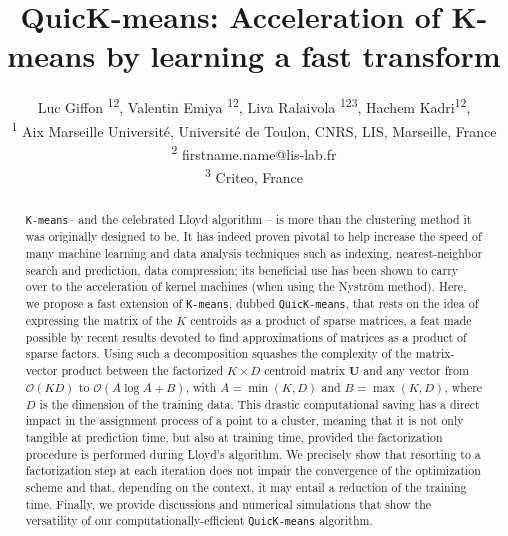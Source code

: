 \documentclass[letterpaper]{article} %
\title{QuicK-means: Acceleration of K-means by learning a fast transform}
\author{%
  Luc Giffon  \textsuperscript{\rm 1}\textsuperscript{\rm 2},
Valentin Emiya \textsuperscript{\rm 1}\textsuperscript{\rm 2},
Liva Ralaivola \textsuperscript{\rm 1}\textsuperscript{\rm 2}\textsuperscript{\rm 3},   Hachem Kadri\textsuperscript{\rm 1}\textsuperscript{\rm 2}, \\
\textsuperscript{\rm 1} Aix Marseille Université, Université de Toulon, CNRS, LIS, Marseille, France \\
\textsuperscript{\rm 2} firstname.name@lis-lab.fr \\
\textsuperscript{\rm 3} Criteo, France
}
\def\datadim{D}
\def\nclusters{K}
\def\kmeans{\texttt{K-means}\xspace}
\begin{document}
\maketitle

\begin{abstract}
\kmeans -- and the celebrated Lloyd algorithm -- is more than the clustering method it was originally designed to be. 
	It has indeed proven pivotal to help increase the speed of many machine learning and data analysis techniques such as indexing, nearest-neighbor search and prediction, data compression; its beneficial use has been shown to carry over to the acceleration of kernel machines (when using the Nyström method). 
	Here, we propose a fast extension of \kmeans, dubbed \texttt{QuicK-means}, that rests on the idea of expressing the matrix of the $\nclusters$ centroids as a product of sparse matrices, a feat made possible by recent results devoted to find approximations of matrices as a product of sparse factors. Using such a decomposition squashes the complexity of the matrix-vector product between the factorized $\nclusters \times \datadim$ centroid matrix $\mathbf{U}$ and any vector from $\mathcal{O}(\nclusters \datadim)$ to $\mathcal{O}(A \log A+B)$, with $A=\min (\nclusters, \datadim)$ and $B=\max (\nclusters, \datadim)$, where $\datadim$ is the dimension of the training data. This drastic computational saving has a direct impact in the assignment process of a point to a cluster, meaning that it is not only tangible at prediction time, but also at training time, provided the factorization procedure is performed during Lloyd's algorithm. We precisely show that resorting to a factorization step at each iteration does not impair the convergence of the optimization scheme and that, depending on the context, it may entail a reduction of the training time. Finally, we provide discussions and numerical simulations that show the versatility of our computationally-efficient  \texttt{QuicK-means} algorithm. 
\end{abstract}








\pagebreak
\pagebreak
\appendix

\end{document}
